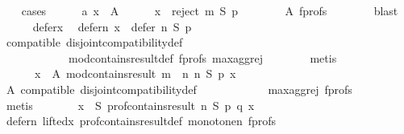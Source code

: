 \begin{isabellebody}
\ \ \isamarkupfalse%
\ cases\isanewline
\ \ \ \ \isamarkupfalse%
\ a{}{\isacharcolon}{\kern0pt}\ {\isachardoublequoteopen}x\ {\isasymin}\ A{\isachardoublequoteclose}\isanewline
\ \ \ \ \isamarkupfalse%
\ {\isachardoublequoteopen}x\ {\isasymin}\ reject\ m\ S\ p{\isachardoublequoteclose}\isanewline
\ \ \ \ \ \ \isamarkupfalse%
\ A\ f{\isacharunderscore}{\kern0pt}profs\isanewline
\ \ \ \ \ \ \isamarkupfalse%
\ blast\isanewline
\ \ \ \ \isamarkupfalse%
\ defer{\isacharunderscore}{\kern0pt}x\ \isamarkupfalse%
\ defer{\isacharunderscore}{\kern0pt}n{\isacharcolon}{\kern0pt}\ {\isachardoublequoteopen}x\ {\isasymin}\ defer\ n\ S\ p{\isachardoublequoteclose}\isanewline
\ \ \ \ \ \ \isamarkupfalse%
\ compatible\ disjoint{\isacharunderscore}{\kern0pt}compatibility{\isacharunderscore}{\kern0pt}def\isanewline
\ \ \ \ \ \ \ \ \ \ \ \ mod{\isacharunderscore}{\kern0pt}contains{\isacharunderscore}{\kern0pt}result{\isacharunderscore}{\kern0pt}def\ f{\isacharunderscore}{\kern0pt}profs\ max{\isacharunderscore}{\kern0pt}agg{\isacharunderscore}{\kern0pt}rej{}\isanewline
\ \ \ \ \ \ \isamarkupfalse%
\ metis\isanewline
\ \ \ \ \isamarkupfalse%
\isanewline
\ \ \ \ \ \ {\isachardoublequoteopen}{\isasymforall}x\ {\isasymin}\ A{\isachardot}{\kern0pt}\ mod{\isacharunderscore}{\kern0pt}contains{\isacharunderscore}{\kern0pt}result\ {\isacharparenleft}{\kern0pt}m\ {\isasymparallel}\isactrlsub {\isasymup}\ n{\isacharparenright}{\kern0pt}\ n\ S\ p\ x{\isachardoublequoteclose}\isanewline
\ \ \ \ \ \ \isamarkupfalse%
\ A\ compatible\ disjoint{\isacharunderscore}{\kern0pt}compatibility{\isacharunderscore}{\kern0pt}def\isanewline
\ \ \ \ \ \ \ \ \ \ \ \ max{\isacharunderscore}{\kern0pt}agg{\isacharunderscore}{\kern0pt}rej{}\ f{\isacharunderscore}{\kern0pt}profs\isanewline
\ \ \ \ \ \ \isamarkupfalse%
\ metis\isanewline
\ \ \ \ \isamarkupfalse%
\ \isamarkupfalse%
\ {\isachardoublequoteopen}{\isasymforall}x\ {\isasymin}\ S{\isachardot}{\kern0pt}\ prof{\isacharunderscore}{\kern0pt}contains{\isacharunderscore}{\kern0pt}result\ n\ S\ p\ q\ x{\isachardoublequoteclose}\isanewline
\ \ \ \ \ \ \isamarkupfalse%
\ defer{\isacharunderscore}{\kern0pt}n\ lifted{\isacharunderscore}{\kern0pt}x\ prof{\isacharunderscore}{\kern0pt}contains{\isacharunderscore}{\kern0pt}result{\isacharunderscore}{\kern0pt}def\ monotone{\isacharunderscore}{\kern0pt}n\ f{\isacharunderscore}{\kern0pt}profs\isanewline

\end{isabellebody}
